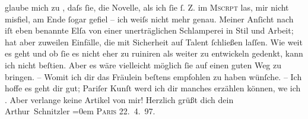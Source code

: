 \begin{ledgroupsized}[t]{13cm}
               glaube mich zu \label{K_L00668_2v}\label{K_L00668_2h}, daſs ſie,
               die Novelle, als ich ſie ſ. Z. im \textsc{Mscrpt} las, mir nicht {\pb}misfiel, am Ende ſogar
               gefiel – ich weiſs nicht mehr genau. Meiner Anſicht nach iſt eben benannte Elſa von einer unerträglichen Schlamperei in Stil
               und Arbeit; hat aber zuweilen Einfälle, die mit Sicherheit auf Talent ſchließen
               laſſen. Wie weit es geht und ob ſie es nicht eher {\pb}\introOben{}zu\introOben{} ruiniren als weiter zu entwickeln gedenkt, kann ich
               nicht beſti{\geminationm}en. Aber es wäre vielleicht möglich ſie auf
               einen guten Weg zu bringen. – Womit ich dir das Fräulein beſtens empfohlen zu haben
               wünſche. –\pend
           \pstart
           Ich hoffe es geht dir gut; Pariſer Kunſt {\pb}werd ich dir manches
               erzählen können, we{\geminationn} ich \label{K_L00668_3v}\label{K_L00668_3h}. Aber verlange keine Artikel von mir! \pend
           \pstart
           Herzlich grüßt dich dein{\\[\baselineskip]}\spacefill\mbox{Arthur Schnitzler}\pend
           \leftskip=0em{}\pstart
           \textsc{Paris}{ }22. 4. 97.\pend
                     \endnumbering{}\end{ledgroupsized}  \newcommand{\dateiname}{L00668}\newcommand{\titel}{Arthur Schnitzler an Hermann Bahr, 22. 4. 1897}\newcommand{\editorInnen}{ Kurt Ifkovits,  Martin Anton Müller}
            \footnotesize
\begin{ledgroupsized}[t]{11.5cm}
\end{ledgroupsized}
         
      